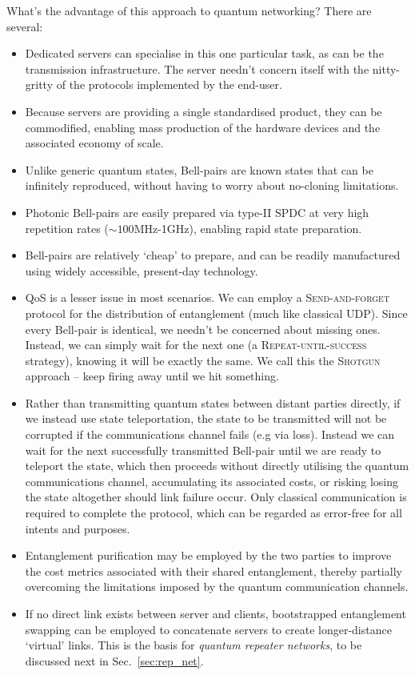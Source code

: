 What's the advantage of this approach to quantum networking? There are several:
\begin{itemize}
\item Dedicated servers can specialise in this one particular task, as can be the transmission infrastructure. The server needn't concern itself with the nitty-gritty of the protocols implemented by the end-user.
\item Because servers are providing a single standardised product, they can be commodified, enabling mass production of the hardware devices and the associated economy of scale.
\item Unlike generic quantum states, Bell-pairs are known states that can be infinitely reproduced, without having to worry about no-cloning limitations.
\item Photonic Bell-pairs are easily prepared via type-II SPDC at very high repetition rates (\mbox{$\sim 100$MHz-1GHz}), enabling rapid state preparation.
\item Bell-pairs are relatively `cheap' to prepare, and can be readily manufactured using widely accessible, present-day technology.
\item QoS is a lesser issue in most scenarios. We can employ a \textsc{Send-and-forget} protocol for the distribution of entanglement (much like classical UDP). Since every Bell-pair is identical, we needn't be concerned about missing ones. Instead, we can simply wait for the next one (a \textsc{Repeat-until-success} strategy), knowing it will be exactly the same. We call this the \textsc{Shotgun} approach -- keep firing away until we hit something.
\item Rather than transmitting quantum states between distant parties directly, if we instead use state teleportation, the state to be transmitted will not be corrupted if the communications channel fails (e.g via loss). Instead we can wait for the next successfully transmitted Bell-pair until we are ready to teleport the state, which then proceeds without directly utilising the quantum communications channel, accumulating its associated costs, or risking losing the state altogether should link failure occur. Only classical communication is required to complete the protocol, which can be regarded as error-free for all intents and purposes.
\item Entanglement purification may be employed by the two parties to improve the cost metrics associated with their shared entanglement, thereby partially overcoming the limitations imposed by the quantum communication channels.
\item If no direct link exists between server and clients, bootstrapped entanglement swapping can be employed to concatenate servers to create longer-distance `virtual' links. This is the basis for \textit{quantum repeater networks}, to be discussed next in Sec.~\ref{sec:rep_net}.
\end{itemize}


